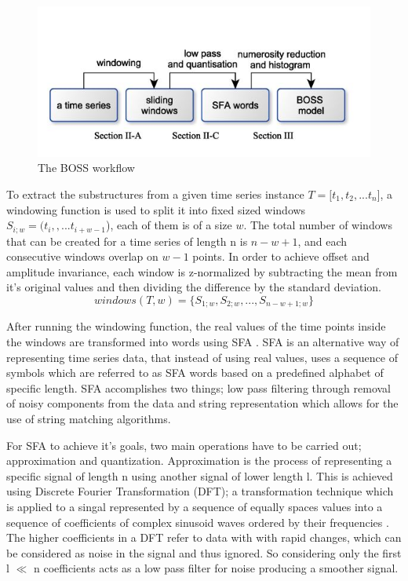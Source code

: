\begin{figure}[!htbp]
    \captionsetup{justification=raggedright}
    \centering
    \includegraphics[scale = 0.5]{BossFlow.JPG}
    \centering
    \caption{The BOSS workflow \cite{schafer2015boss}}
    \label{Img:BossFlow}
\end{figure}

To extract the substructures from a given time series instance $T = [t_{1},t_{2},...t_{n}$],
a windowing function is used to split it into fixed sized windows $S_{i;w} = (t_{i},,...t_{i+w-1}$), each of them is of a size $w$.
The total number of windows that can be created for a time series of length n is $n-w+1$, and each consecutive windows overlap on $w-1$ points.
In order to achieve offset and amplitude invariance, each window is z-normalized by subtracting the mean from it's original values and then dividing the difference
by the standard deviation.
\begin{equation}
    windows(T,w) = \{ S_{1;w}, S_{2;w}, ...,  S_{n-w+1;w} \}
\end{equation}

After running the windowing function, the real values of the time points inside the windows are transformed into words using SFA \cite{schafer2012sfa}.
SFA is an alternative way of representing time series data, that instead of using real values, uses a sequence of symbols which are referred to as SFA words based on a predefined alphabet of specific length.
SFA accomplishes two things; low pass filtering through removal of noisy components from the data and string representation which allows for the use of string matching algorithms.

For SFA to achieve it's goals, two main operations have to be carried out; approximation and quantization.
Approximation is the process of representing a specific signal of length n using another signal of lower length l.
This is achieved using Discrete Fourier Transformation (DFT); a transformation technique which is applied to a singal represented by a sequence of equally spaces values
into a sequence of coefficients of complex sinusoid waves ordered by their frequencies \cite{liao2017separable}. The higher coefficients in a DFT refer to data with
with rapid changes, which can be considered as noise in the signal and thus ignored. So considering only the first l $\ll$ n coefficients acts as a low pass filter for noise
producing a smoother signal.

